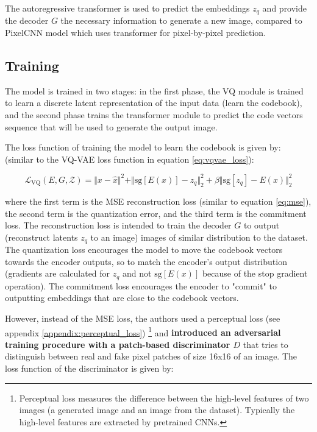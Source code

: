 The autoregressive transformer is used to predict the embeddings $z_q$ and provide the decoder $G$ the necessary information to generate a new image, compared to PixelCNN model \cite{pixelcnn} which uses transformer for pixel-by-pixel prediction.




\subsection{Training}

The model is trained in two stages: in the first phase, the VQ module is trained to learn a discrete latent representation of the input data (learn the codebook), and the second phase trains the transformer module to predict the code vectors sequence that will be used to generate the output image.

The loss function of training the model to learn the codebook is given by: (similar to the VQ-VAE loss function in equation \ref{eq:vqvae_loss}):

\begin{equation}
    \mathcal{L}_{\text{VQ}} (E, G, \mathcal{Z}) = \Vert x - \hat{x} \Vert ^2 + \Vert \text{sg}[E(x)] - z_q \Vert ^2_2 +  \beta \Vert \text{sg}[z_q] - E(x) \Vert ^2_2
\end{equation}

where the first term is the MSE reconstruction loss (similar to equation \ref{eq:mse}), the second term is the quantization error, and the third term is the commitment loss. The reconstruction loss is intended to train the decoder $G$ to output (reconstruct latents $z_q$ to an image) images of similar distribution to the dataset. The quantization loss encourages the model to move the codebook vectors towards the encoder outputs, so to match the encoder's output distribution (gradients are calculated for $z_q$ and not $\text{sg}[E(x)]$ because of the stop gradient operation). The commitment loss encourages the encoder to "commit" to outputting embeddings that are close to the codebook vectors.

However, instead of the MSE loss, the authors used a perceptual loss \cite{perceptual_loss} (see appendix \ref{appendix:perceptual_loss}) \footnote[4]{Perceptual loss measures the difference between the high-level features of two images (a generated image and an image from the dataset). Typically the high-level features are extracted by pretrained CNNs.} and \textbf{introduced an adversarial training procedure with a patch-based discriminator $D$} that tries to distinguish between real and fake pixel patches of size 16x16 of an image. The loss function of the discriminator is given by:

